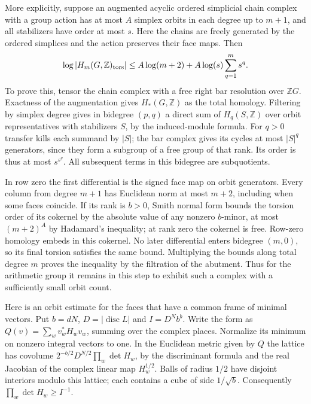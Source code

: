 \documentclass[11pt]{amsart}
\theoremstyle{definition}
\theoremstyle{remark}
\begin{document}
More explicitly, suppose an augmented acyclic ordered simplicial
chain complex with a group action has at most $A$ simplex orbits in
each degree up to $m+1$, and all stabilizers have order at most $s$.
Here the chains are freely generated by the ordered simplices and
the action preserves their face maps. Then
\[
 \log|H_m(G,\mathbb Z)_{\rm tors}|
 \le A\log(m+2)+A\log(s)\sum_{q=1}^m s^q .
\]
To prove this, tensor the chain complex with a free right bar
resolution over $\mathbb ZG$. Exactness of the augmentation gives
$H_*(G,\mathbb Z)$ as the total homology. Filtering by simplex degree
gives in bidegree $(p,q)$ a direct sum of $H_q(S,\mathbb Z)$ over
orbit representatives with stabilizers $S$, by the induced-module
formula. For $q>0$ transfer kills each summand by $|S|$; the bar
complex gives its cycles at most $|S|^q$ generators, since they form
a subgroup of a free group of that rank. Its order is thus at most
$s^{s^q}$. All subsequent terms in this bidegree are subquotients.

In row zero the first differential is the signed face map on orbit
generators. Every column from degree $m+1$ has Euclidean norm at most
$m+2$, including when some faces coincide. If its rank is $b>0$,
Smith normal form bounds the torsion order of its cokernel by the
absolute value of any nonzero $b$-minor, at most $(m+2)^A$ by
Hadamard's inequality; at rank zero the cokernel is free.
Row-zero homology embeds in this cokernel. No later differential
enters bidegree $(m,0)$, so its final torsion satisfies the same
bound. Multiplying the bounds along total degree $m$ proves the
inequality by the filtration of the abutment. Thus for the arithmetic
group it remains in this step to exhibit such a complex with a
sufficiently small orbit count.

Here is an orbit estimate for the faces that have a common frame
of minimal vectors. Put $b=dN$, $D=|\operatorname{disc}L|$ and
$I=D^N b^b$. Write the form as $Q(v)=\sum_w v_w^*H_wv_w$, summing
over the complex places. Normalize its minimum on nonzero integral
vectors to one. In the Euclidean metric given by $Q$ the lattice has
covolume $2^{-b/2}D^{N/2}\prod_w\det H_w$, by the discriminant formula
and the real Jacobian of the complex linear map $H_w^{1/2}$.
Balls of radius $1/2$ have disjoint interiors modulo this lattice;
each contains a cube of side $1/\sqrt b$. Consequently
$\prod_w\det H_w\ge I^{-1}$.
\end{document}

